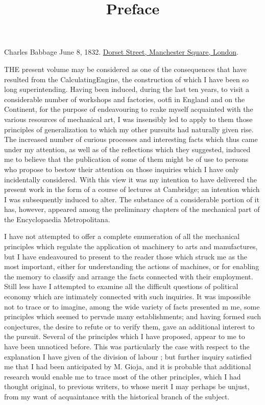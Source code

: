 \documentclass{article}
\begin{document}
\title{Preface}

\maketitle


Charles Babbage June 8, 1832. \href{https://www.openstreetmap.org/#map=19/51.51673/-0.15303}{Dorset Street, Manchester Square, London}.


THE present volume may be considered as one of the consequences that have resulted from the CalculatingEngine, the construction of which I have been so long superintending. Having been induced, during the last ten years, to visit a considerable number of workshops and factories, ootfi in England and on the Continent, for the purpose of endeavouring to rcake myself acquainted with the various resources of mechanical art, I was insensibly led to apply to them those principles of generalization to which my other pursuits had naturally given rise. The increased number of curious processes and interesting facts which thus came under my attention, as well as of the reflections which they suggested, induced me to believe that the publication of some of them might be of use to persons who propose to bestow their attention on those inquiries which I have only incidentally considered. With this view it was my intention to have delivered the present work in the form of a course of lectures at Cambridge; an intention which I was subsequently induced to alter. The substance of a considerable portion of it has, however, appeared among the preliminary chapters of the mechanical part of the Encyclopaedia Metropolitana.


I have not attempted to offer a complete enumeration of all the mechanical principles which regulate the application ot machinery to arts and manufactures, but I have endeavoured to present to the reader those which struck me as the most important, either for understanding the actions of machines, or for enabling the memory to classify and arrange the facts connected with their employment. Still less have I attempted to examine all the difficult questions of political economy which are intimately connected with such inquiries. It was impossible not to trace or to imagine, among the wide variety of facts presented m me, some principles which seemed to pervade many establishments; and having formed such conjectures, the desire to refute or to verify them, gave an additional interest to the pursuit. Several of the principles which I have proposed, appear to me to have been unnoticed before. This was particularly the case with respect to the explanation I have given of the division of labour ; but further inquiry satisfied me that I had been anticipated by M. Gioja, and it is probable that additional research would enable me to trace most of the other principles, which I had thought original, to previous writers, to whose merit I may perhaps be unjust, from my want of acquaintance with the historical branch of the subject.
\end{document}
